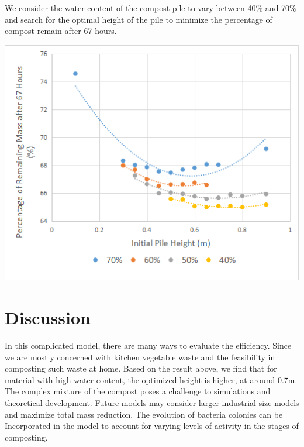 \documentclass[12pt, letterpaper, titlepage]{article}
\begin{document}
   	We consider the water content of the compost pile to vary between 40\% and 70\% and search for the optimal height of the pile to minimize the percentage of compost remain after 67 hours.
   	\begin{minipage}[h]{\linewidth}
    	\includegraphics[scale=1]{opt-curve}
        \label{tm-ply}
   	\end{minipage}

\section{Discussion}
    In this complicated model, there are many ways to evaluate the efficiency. Since we are mostly concerned with kitchen vegetable waste and the feasibility in composting such waste at home. Based on the result above, we find that for material with high water content, the optimized height is higher, at around 0.7m. \\
    The complex mixture of the compost poses a challenge to simulations and theoretical development. Future models may consider larger industrial-size models and maximize total mass reduction. The evolution of bacteria colonies can be Incorporated in the model to account for varying levels of activity in the stages of composting.
    
\end{document}
